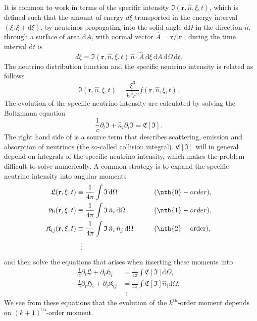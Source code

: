 It is common to work in terms of the specific intensity $\mathfrak{I}(\mathbf{r},\hat{n},\xi,t)$,
which is defined such that the amount of energy $d\xi$ transported in the energy interval
$(\xi,\xi+\mathrm{d}\xi)$, by neutrinos propagating into 
the solid angle $\mathrm{d}\Omega$ in the direction $\hat{n}$,
through a surface of area $\mathrm{d}A$, with normal vector $\hat{A} = \mathbf{r}/|\mathbf{r}|$, 
during the time interval $\mathrm{d}t$ is
\begin{equation} \label{eqN:intns}
d \xi = \mathfrak{I}(\mathbf{r},\hat{n},\xi,t) \, \hat{n} \cdot \hat{A}
\, \mathrm{d}\xi \, \mathrm{d}A \, \mathrm{d}\Omega \, \mathrm{d}t.
\end{equation}
The neutrino distribution function and the specific neutrino intensity is related as follows
\begin{equation}
\mathfrak{I}(\mathbf{r},\hat{n},\xi,t) = \frac{\xi^3}{h^3 c^2} f(\mathbf{r},\hat{n},\xi,t).
\end{equation}
The evolution of the specific neutrino intensity are calculated by solving the Boltzmann equation
\begin{equation} \label{eqN:boltz}
\frac{1}{c} \partial_t \mathfrak{I} + \hat{n}_i \partial_i \mathfrak{I} = \mathfrak{C} [\mathfrak{I}].
\end{equation}
The right hand side of  is a source term that describes scattering, emission and absorption
of neutrinos (the so-called collision integral). $\mathfrak{C} [\mathfrak{I}]$ will in general depend on integrals of the specific neutrino intensity, which makes the problem difficult to solve numerically. 
A common strategy is to expand the specific neutrino intensity into angular moments
\begin{alignat}{2}
\mathfrak{L}(\mathbf{r},\xi,t) &\equiv  \frac{1}{4\pi} \int \mathfrak{I} \, \mathrm{d} \Omega &&\qquad (\nth{0}-order), \\ 
\mathfrak{H}_i(\mathbf{r},\xi,t) &\equiv  \frac{1}{4\pi} \int \mathfrak{I} \, \hat{n}_i \, \mathrm{d} \Omega &&\qquad (\nth{1}-order), \\
\mathfrak{K}_{ij}(\mathbf{r},\xi,t) &\equiv  \frac{1}{4\pi} \int \mathfrak{I} \, \hat{n}_i \, \hat{n}_j \, \mathrm{d} \Omega &&\qquad (\nth{2}-\text{order}), \\
& \ \ \vdots && \nonumber
\end{alignat}
and then solve the equations that arises when inserting these moments into 
\begin{align}
\frac{1}{c} \partial_t \mathfrak{L} +  \partial_i \mathfrak{H}_i &= \frac{1}{4\pi} \int \mathfrak{C} [\mathfrak{I}] \mathrm{d} \Omega, \\
\frac{1}{c} \partial_t \mathfrak{H}_i + \partial_i \mathfrak{K}_{ij} &= \frac{1}{4\pi} \int \mathfrak{C} [\mathfrak{I}] \hat{n}_i \mathrm{d} \Omega. \\
& \ \ \vdots \nonumber
\end{align}
We see from these equations that the evolution of the $k^{\text{th}}$-order moment depends on $(k+1)^{\text{th}}$-order moment.

